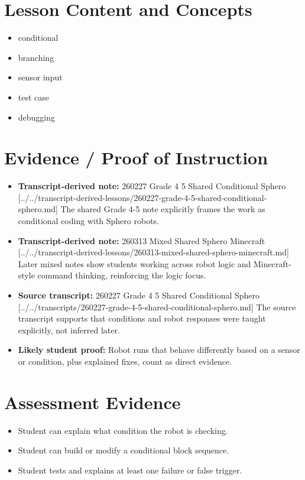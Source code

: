 \documentclass[11pt]{article}
\begin{document}
\section*{Lesson Content and Concepts}
\begin{itemize}[leftmargin=*]
\item conditional
\item branching
\item sensor input
\item test case
\item debugging
\end{itemize}

\section*{Evidence / Proof of Instruction}
\begin{itemize}[leftmargin=*]
\item \textbf{Transcript-derived note:} 260227 Grade 4 5 Shared Conditional Sphero [../../transcript-derived-lessons/260227-grade-4-5-shared-conditional-sphero.md] The shared Grade 4-5 note explicitly frames the work as conditional coding with Sphero robots.
\item \textbf{Transcript-derived note:} 260313 Mixed Shared Sphero Minecraft [../../transcript-derived-lessons/260313-mixed-shared-sphero-minecraft.md] Later mixed notes show students working across robot logic and Minecraft-style command thinking, reinforcing the logic focus.
\item \textbf{Source transcript:} 260227 Grade 4 5 Shared Conditional Sphero [../../transcripts/260227-grade-4-5-shared-conditional-sphero.md] The source transcript supports that conditions and robot responses were taught explicitly, not inferred later.
\item \textbf{Likely student proof:} Robot runs that behave differently based on a sensor or condition, plus explained fixes, count as direct evidence.
\end{itemize}

\section*{Assessment Evidence}
\begin{itemize}[leftmargin=*]
\item Student can explain what condition the robot is checking.
\item Student can build or modify a conditional block sequence.
\item Student tests and explains at least one failure or false trigger.
\end{itemize}
\end{document}
